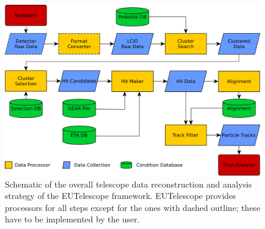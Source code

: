 \begin{figure}[tbp]
	\center
	\includegraphics[width=.9\textwidth]{figures/eutel-strategy.png}
	\caption[The EUTelescope data analysis strategy]{Schematic of the overall telescope data reconstruction and analysis strategy of the EUTelescope framework. EUTelescope provides processors for all steps except for the ones with dashed outline; these have to be implemented by the user.}
	\label{fig:offline:strategy}
\end{figure}
